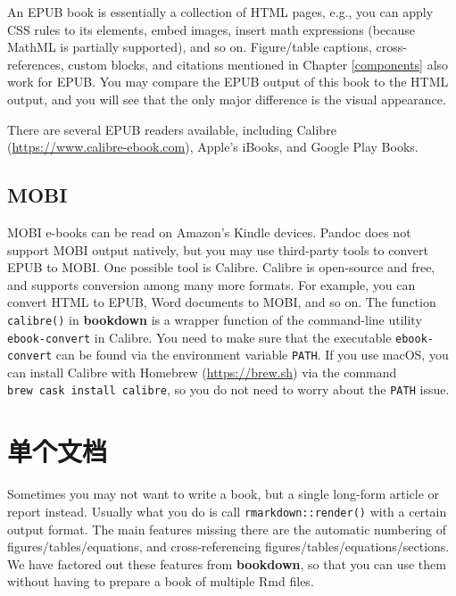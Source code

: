 \documentclass[
  12pt,
]{krantz}
\theoremstyle{definition}
\theoremstyle{definition}
\theoremstyle{definition}
\theoremstyle{definition}
\theoremstyle{remark}
\begin{document}
An EPUB book is essentially a collection of HTML pages, e.g., you can apply CSS rules to its elements, embed images, insert math expressions (because MathML is partially supported), and so on. Figure/table captions, cross-references, custom blocks, and citations mentioned in Chapter \ref{components} also work for EPUB. You may compare the EPUB output of this book to the HTML output, and you will see that the only major difference is the visual appearance.

There are several EPUB readers available, including Calibre (\url{https://www.calibre-ebook.com}), Apple's iBooks, and Google Play Books.

\hypertarget{mobi}{%
\subsection{MOBI}\label{mobi}}

MOBI e-books can be read on Amazon's Kindle devices. Pandoc does not support MOBI output natively, but you may use third-party tools to convert EPUB to MOBI. One possible tool is Calibre. Calibre is open-source and free, and supports conversion among many more formats. For example, you can convert HTML to EPUB, Word documents to MOBI, and so on. The function \texttt{calibre()} in \textbf{bookdown} is a wrapper function of the command-line utility \texttt{ebook-convert} in Calibre. You need to make sure that the executable \texttt{ebook-convert} can be found via the environment variable \texttt{PATH}. If you use macOS, you can install Calibre with Homebrew (\url{https://brew.sh}) via the command \texttt{brew\ cask\ install\ calibre}, so you do not need to worry about the \texttt{PATH} issue.

\hypertarget{a-single-document}{%
\section{单个文档}\label{a-single-document}}

Sometimes you may not want to write a book, but a single long-form article or report instead. Usually what you do is call \texttt{rmarkdown::render()} with a certain output format. The main features missing there are the automatic numbering of figures/tables/equations, and cross-referencing figures/tables/equations/sections. We have factored out these features from \textbf{bookdown}, so that you can use them without having to prepare a book of multiple Rmd files.
\end{document}
